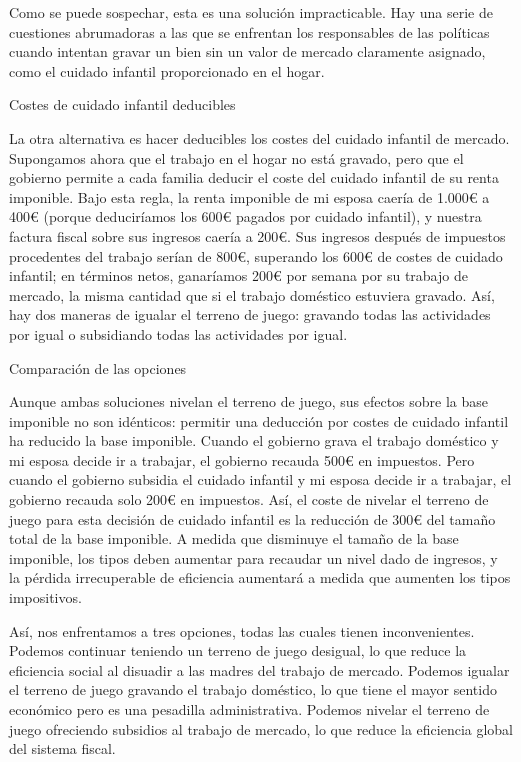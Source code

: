 \documentclass[10pt,a4paper]{article}
\begin{document}
Como se puede sospechar, esta es una solución impracticable. Hay una serie de cuestiones abrumadoras a las que se enfrentan los responsables de las políticas cuando intentan gravar un bien sin un valor de mercado claramente asignado, como el cuidado infantil proporcionado en el hogar.

Costes de cuidado infantil deducibles

La otra alternativa es hacer deducibles los costes del cuidado infantil de mercado. Supongamos ahora que el trabajo en el hogar no está gravado, pero que el gobierno permite a cada familia deducir el coste del cuidado infantil de su renta imponible. Bajo esta regla, la renta imponible de mi esposa caería de 1.000€ a 400€ (porque deduciríamos los 600€ pagados por cuidado infantil), y nuestra factura fiscal sobre sus ingresos caería a 200€. Sus ingresos después de impuestos procedentes del trabajo serían de 800€, superando los 600€ de costes de cuidado infantil; en términos netos, ganaríamos 200€ por semana por su trabajo de mercado, la misma cantidad que si el trabajo doméstico estuviera gravado. Así, hay dos maneras de igualar el terreno de juego: gravando todas las actividades por igual o subsidiando todas las actividades por igual.

Comparación de las opciones

Aunque ambas soluciones nivelan el terreno de juego, sus efectos sobre la base imponible no son idénticos: permitir una deducción por costes de cuidado infantil ha reducido la base imponible. Cuando el gobierno grava el trabajo doméstico y mi esposa decide ir a trabajar, el gobierno recauda 500€ en impuestos. Pero cuando el gobierno subsidia el cuidado infantil y mi esposa decide ir a trabajar, el gobierno recauda solo 200€ en impuestos. Así, el coste de nivelar el terreno de juego para esta decisión de cuidado infantil es la reducción de 300€ del tamaño total de la base imponible. A medida que disminuye el tamaño de la base imponible, los tipos deben aumentar para recaudar un nivel dado de ingresos, y la pérdida irrecuperable de eficiencia aumentará a medida que aumenten los tipos impositivos.

Así, nos enfrentamos a tres opciones, todas las cuales tienen inconvenientes. Podemos continuar teniendo un terreno de juego desigual, lo que reduce la eficiencia social al disuadir a las madres del trabajo de mercado. Podemos igualar el terreno de juego gravando el trabajo doméstico, lo que tiene el mayor sentido económico pero es una pesadilla administrativa. Podemos nivelar el terreno de juego ofreciendo subsidios al trabajo de mercado, lo que reduce la eficiencia global del sistema fiscal.
\end{document}
